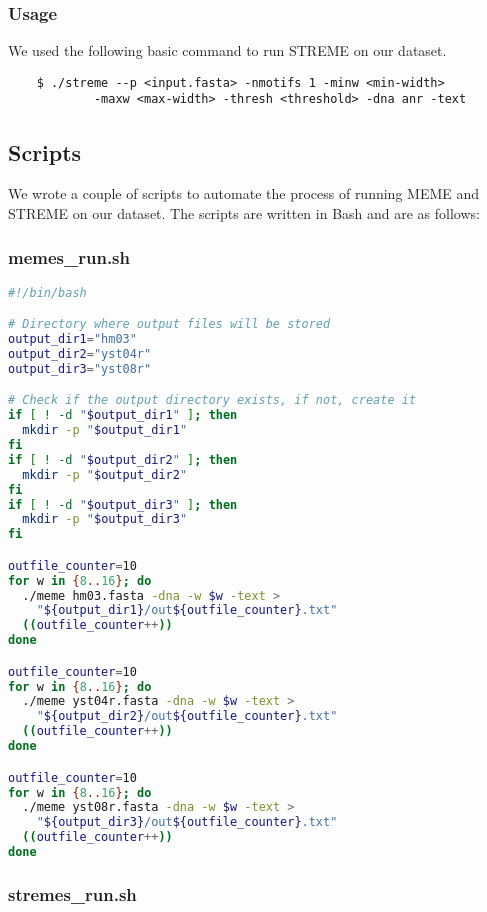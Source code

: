 \subsubsection{Usage}

We used the following basic command to run STREME on our dataset.

\begin{verbatim}
	$ ./streme --p <input.fasta> -nmotifs 1 -minw <min-width>
			-maxw <max-width> -thresh <threshold> -dna anr -text
\end{verbatim}

\subsection{Scripts}

We wrote a couple of scripts to automate the process of running MEME and STREME on our dataset. The scripts are written in Bash and are as follows:

\subsubsection{memes\_run.sh}

\begin{lstlisting}[language=bash]
#!/bin/bash

# Directory where output files will be stored
output_dir1="hm03"
output_dir2="yst04r"
output_dir3="yst08r"

# Check if the output directory exists, if not, create it
if [ ! -d "$output_dir1" ]; then
  mkdir -p "$output_dir1"
fi
if [ ! -d "$output_dir2" ]; then
  mkdir -p "$output_dir2"
fi
if [ ! -d "$output_dir3" ]; then
  mkdir -p "$output_dir3"
fi

outfile_counter=10
for w in {8..16}; do
  ./meme hm03.fasta -dna -w $w -text >
    "${output_dir1}/out${outfile_counter}.txt"
  ((outfile_counter++))
done

outfile_counter=10
for w in {8..16}; do
  ./meme yst04r.fasta -dna -w $w -text >
    "${output_dir2}/out${outfile_counter}.txt"
  ((outfile_counter++))
done

outfile_counter=10
for w in {8..16}; do
  ./meme yst08r.fasta -dna -w $w -text >
    "${output_dir3}/out${outfile_counter}.txt"
  ((outfile_counter++))
done
\end{lstlisting}

\subsubsection{stremes\_run.sh}

